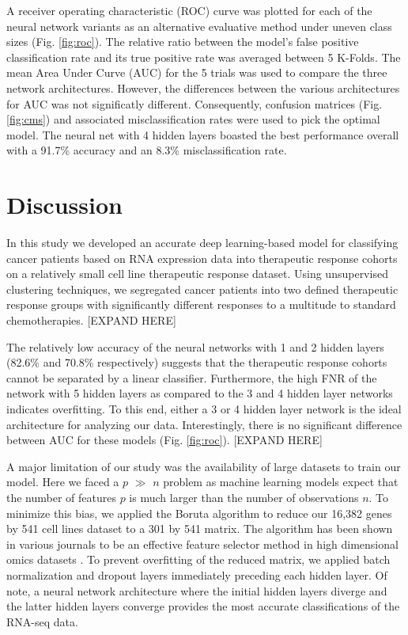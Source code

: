 \documentclass[10pt, letterpaper]{article}
\begin{document}
\begin{multicols}{2}
A receiver operating characteristic (ROC) curve was plotted for each of the neural network variants as an alternative evaluative method under uneven class sizes (Fig. \ref{fig:roc}). The relative ratio between the model’s false positive classification rate and its true positive rate was averaged between 5 K-Folds. The mean Area Under Curve (AUC) for the 5 trials was used to compare the three network architectures. However, the differences between the various architectures for AUC was not significatly different. Consequently, confusion matrices (Fig. \ref{fig:cms}) and associated misclassification rates were used to pick the optimal model. The neural net with 4 hidden layers boasted the best performance overall with a 91.7\% accuracy and an 8.3\% misclassification rate.


\section{Discussion}
In this study we developed an accurate deep learning-based model for classifying cancer patients based on RNA expression data into therapeutic response cohorts on a relatively small cell line therapeutic response dataset. Using unsupervised clustering techniques, we segregated cancer patients into two defined therapeutic response groups with significantly different responses to a multitude to standard chemotherapies. [EXPAND HERE]

The relatively low accuracy of the neural networks with 1 and 2 hidden layers (82.6\% and 70.8\% respectively) suggests that the therapeutic response cohorts cannot be separated by a linear classifier. Furthermore, the high FNR of the network with 5 hidden layers as compared to the 3 and 4 hidden layer networks indicates overfitting. To this end, either a 3 or 4 hidden layer network is the ideal architecture for analyzing our data. Interestingly, there is no significant difference between AUC for these models (Fig. \ref{fig:roc}). [EXPAND HERE]

A major limitation of our study was the availability of large datasets to train our model. Here we faced a $p$ $\gg$ $n$ problem as machine learning models expect that the number of features $p$ is much larger than the number of observations $n$. To minimize this bias, we applied the Boruta algorithm to reduce our 16,382 genes by 541 cell lines dataset to a 301 by 541 matrix. The algorithm has been shown in various journals to be an effective feature selector method in high dimensional omics datasets \cite{boruta}. To prevent overfitting of the reduced matrix, we applied batch normalization and dropout layers immediately preceding each hidden layer. Of note, a neural network architecture where the initial hidden layers diverge and the latter hidden layers converge provides the most accurate classifications of the RNA-seq data.


\end{multicols}
\end{document}
